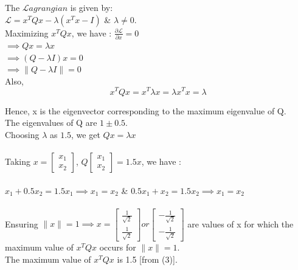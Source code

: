\documentclass[a4paper,fleqn,11pt]{article}
\theoremstyle{mytheor}
\begin{document}
\section{}

The $\mathscr{L}agrangian$ is given by: \\
$\mathscr{L} = x^T Q x - \lambda (x^T x - I)$ \& $\lambda \neq 0.$ \\
Maximizing $x^T Qx$, we have : 
$\frac{\partial \mathscr{L}}{\partial x} = 0$ \\
$\implies Qx = \lambda x$ \\
$\implies (Q - \lambda I)x = 0$ \\
$\implies \|Q - \lambda I\| = 0$ \\
Also,
\begin{equation}
x^T Qx = x^T \lambda x = \lambda x^T x = \lambda
\end{equation}

Hence, x is the eigenvector corresponding to the maximum eigenvalue of Q. \\
The eigenvalues of Q are $1 \pm 0.5$. \\
Choosing $\lambda$ as $1.5$, we get $Qx = \lambda x$ \\ \\
Taking $x = \begin{bmatrix}
			x_{1} \\
			x_{2}
			\end{bmatrix}$, \hspace{1ex}
$Q \begin{bmatrix}
   x_{1} \\
   x_{2}
   \end{bmatrix} = 1.5x$, we have : \\ \\
$x_{1} + 0.5x_{2} = 1.5x_{1} \implies x_{1} = x_{2}$ \& $0.5x_{1} + x_{2} = 1.5x_{2} \implies x_{1} = x_{2}$ \\ \\
Ensuring $\|x\| = 1 \implies x = \begin{bmatrix}
								  \frac{1}{\sqrt{2}} \\
								  \frac{1}{\sqrt{2}}
								  \end{bmatrix} or
								  \begin{bmatrix}
								  -\frac{1}{\sqrt{2}} \\
								  -\frac{1}{\sqrt{2}}
								  \end{bmatrix}$
are values of x for which the maximum value of $x^T Q x$ occurs for $\|x\| = 1$. \\
The maximum value of  $x^T Q x$ is 1.5 [from (3)].
\end{document}
